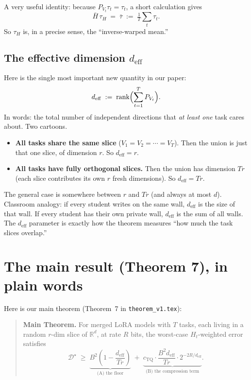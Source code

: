 \documentclass[11pt]{article}
\newcommand{\R}{\mathbb{R}}
\newcommand{\tauH}{\tau_{\!H}}
\newcommand{\deff}{d_{\mathrm{eff}}}
\newcommand{\Hbar}{\bar H}
\begin{document}
A very useful identity: because $P_{V_t}\tau_t = \tau_t$, a short
calculation gives
\[
  \Hbar\,\tauH \;=\; \bar\tau \;:=\; \tfrac{1}{T}\sum_t \tau_t.
\]
So $\tauH$ is, in a precise sense, the ``inverse-warped mean.''

\subsection{The effective dimension $\deff$}

Here is the single most important new quantity in our paper:
\[
  \deff \;:=\; \text{rank}\Bigl(\sum_{t=1}^T P_{V_t}\Bigr).
\]
In words: the total number of independent directions that \emph{at
least one} task cares about. Two cartoons.
\begin{itemize}[nosep]
  \item \textbf{All tasks share the same slice} ($V_1 = V_2 = \cdots =
        V_T$). Then the union is just that one slice, of dimension
        $r$. So $\deff = r$.
  \item \textbf{All tasks have fully orthogonal slices.} Then the
        union has dimension $Tr$ (each slice contributes its own $r$
        fresh dimensions). So $\deff = Tr$.
\end{itemize}
The general case is somewhere between $r$ and $Tr$ (and always at most
$d$). Classroom analogy: if every student writes on the same wall,
$\deff$ is the size of that wall. If every student has their own
private wall, $\deff$ is the sum of all walls. The $\deff$ parameter
is exactly how the theorem measures ``how much the task slices
overlap.''

\section{The main result (Theorem 7), in plain words}\label{sec:thm}

Here is our main theorem (Theorem~7 in \texttt{theorem\_v1.tex}):

\begin{quote}
\textbf{Main Theorem.} For merged LoRA models with $T$ tasks, each
living in a random $r$-dim slice of $\R^d$, at rate $R$ bits, the
worst-case $H_t$-weighted error satisfies
\begin{equation}\label{eq:main}
  \mathcal{D}^\star
  \;\geq\;
  \underbrace{B^2\!\left(1 - \frac{\deff}{Tr}\right)}_{\text{(A) the floor}}
  \;+\;
  \underbrace{c_{\mathrm{TQ}}\cdot\frac{B^2\deff}{Tr}\cdot 2^{-2R/\deff}}_{\text{(B) the compression term}}.
\end{equation}
\end{quote}
\end{document}
